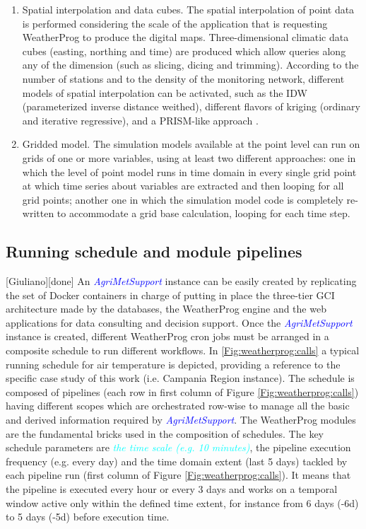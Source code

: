 \documentclass[authoryear,preprint,review,12pt]{elsarticle}
\newcommand{\update}[1]{\emph{\textcolor{blue}{#1}}}
\newcommand{\review}[1]{\emph{\textcolor{cyan}{#1}}}
\newcommand{\gci}{\update{AgriMetSupport}\xspace}
\begin{document}
\begin{enumerate}
    \item Spatial interpolation and data cubes. The spatial interpolation of point data is performed considering the scale of the application that is requesting WeatherProg to produce the digital maps.
    Three-dimensional climatic data cubes (easting, northing and time) are produced which allow queries along any of the dimension (such as slicing, dicing and trimming). According to the number of stations and to the density of the monitoring network, different models of spatial interpolation can be activated, such as the IDW (parameterized inverse distance weithed), different flavors of kriging (ordinary and iterative regressive), and a PRISM-like approach \citep{Daly08_PRISM_USA}.
    
    \item Gridded model. The simulation models available at the point level can run on grids of one or more variables, using at least two different approaches: one in which the level of point model runs in time domain in every single grid point at which time series about variables are extracted and then looping for all grid points; another one in which the simulation model code is completely re-written to accommodate a grid base calculation, looping for each time step.
    
\end{enumerate}

\subsection{ Running schedule and module pipelines }[Giuliano][done]
An \gci instance can be easily created by replicating the set of Docker containers in charge of putting in place the three-tier GCI architecture made by the databases, the WeatherProg engine and the web applications for data consulting and decision support.
Once the \gci instance is created, different WeatherProg cron jobs must be arranged in a composite schedule to run %
different workflows.
In \cref{Fig:weatherprog:calls} a typical running schedule for air temperature is depicted, providing a reference to the specific case study of this work (i.e. Campania Region instance).
The schedule is composed of pipelines (each row in first column of Figure \ref{Fig:weatherprog:calls}) having different scopes which are orchestrated row-wise to manage all the basic and derived information required by \gci.
The WeatherProg modules are the fundamental bricks used in the composition of schedules.
The key schedule parameters are \review{the time scale (e.g. 10 minutes)}, the pipeline execution frequency (e.g. every day) and the time domain extent (last 5 days) tackled by each pipeline run (first column of Figure \ref{Fig:weatherprog:calls}).
It means that the pipeline is executed every hour or every 3 days and works on a temporal window active only within the defined time extent, for instance from 6 days (-6d) to 5 days (-5d) before execution time.
\end{document}
